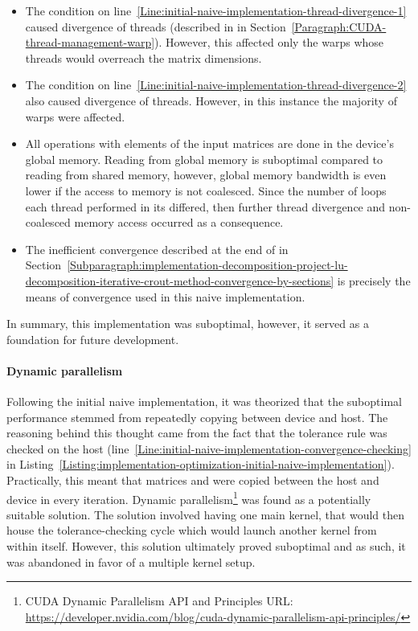 \begin{itemize}
	\item The condition on line~\ref{Line:initial-naive-implementation-thread-divergence-1} caused divergence of threads (described in \textit{} in Section~\ref{Paragraph:CUDA-thread-management-warp}). However, this affected only the warps whose threads would overreach the matrix dimensions.
	\item The condition on line~\ref{Line:initial-naive-implementation-thread-divergence-2} also caused divergence of threads. However, in this instance the majority of warps were affected.
	\item All operations with elements of the input matrices are done in the device's global memory. Reading from global memory is suboptimal compared to reading from shared memory, however, global memory bandwidth is even lower if the access to memory is not coalesced. Since the number of loops each thread performed in its  differed, then further thread divergence and non-coalesced memory access occurred as a consequence.
	\item The inefficient convergence described at the end of \textit{} in Section~\ref{Subparagraph:implementation-decomposition-project-lu-decomposition-iterative-crout-method-convergence-by-sections} is precisely the means of convergence used in this naive implementation.
\end{itemize}

In summary, this implementation was suboptimal, however, it served as a foundation for future development.

\paragraph{Dynamic parallelism}\label{Paragraph:implementation-optimization-dynamic-parallelism}
Following the initial naive implementation, it was theorized that the suboptimal performance stemmed from repeatedly copying between device and host. The reasoning behind this thought came from the fact that the tolerance rule was checked on the host (line~\ref{Line:initial-naive-implementation-convergence-checking} in Listing~\ref{Listing:implementation-optimization-initial-naive-implementation}). Practically, this meant that matrices  and  were copied between the host and device in every iteration. Dynamic parallelism\footnote{CUDA Dynamic Parallelism API and Principles URL: \url{https://developer.nvidia.com/blog/cuda-dynamic-parallelism-api-principles/}} was found as a potentially suitable solution. The solution involved having one main kernel, that would then house the tolerance-checking  cycle which would launch another kernel from within itself. However, this solution ultimately proved suboptimal and as such, it was abandoned in favor of a multiple kernel setup. 

